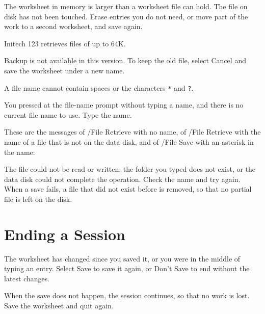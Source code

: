 \Solution The worksheet in memory is larger than a worksheet file can
hold.  The file on disk has not been touched.  Erase entries you do not
need, or move part of the work to a second worksheet, and save again.

\Solution Initech 123 retrieves files of up to 64K.

\Solution Backup is not available in this version.  To keep the old file,
select Cancel and save the worksheet under a new name.

\Solution A file name cannot contain spaces or the characters \texttt{*}
and \texttt{?}.

\Solution You pressed  at the file-name prompt without typing
a name, and there is no current file name to use.  Type the name.

These are the messages of /File Retrieve with no name, of /File Retrieve
with the name of a file that is not on the data disk, and of /File Save
with an asterisk in the name:


\Solution The file could not be read or written: the folder you typed does
not exist, or the data disk could not complete the operation.  Check the
name and try again.  When a save fails, a file that did not exist before is
removed, so that no partial file is left on the disk.

\section{Ending a Session}
\Solution The worksheet has changed since you saved it, or you were in the
middle of typing an entry.  Select Save to save it again, or Don't Save to
end without the latest changes.

\Solution When the save does not happen, the session continues, so that no
work is lost.  Save the worksheet and quit again.
